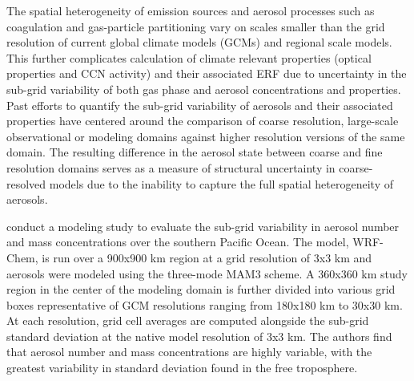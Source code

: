 The spatial heterogeneity of emission sources and aerosol processes such as coagulation and gas-particle partitioning vary on scales smaller than the grid resolution of current global climate models (GCMs) and regional scale models. This further complicates calculation of climate relevant properties  (optical properties and CCN activity) and their associated ERF due to uncertainty in the sub-grid variability of both gas phase and aerosol concentrations and properties. Past efforts to quantify the sub-grid variability of aerosols and their associated properties have centered around the comparison of coarse resolution, large-scale observational or modeling domains against higher resolution versions of the same domain. The resulting difference in the aerosol state between coarse and fine resolution domains serves as a measure of structural uncertainty in coarse-resolved models due to the inability to capture the full spatial heterogeneity of aerosols. 

\cite{lin_quantification_2017} conduct a modeling study to evaluate the sub-grid variability in aerosol number and mass concentrations over the southern Pacific Ocean. The model, WRF-Chem, is run over a 900x900 km region at a grid resolution of 3x3 km and aerosols were modeled using the three-mode MAM3 scheme. A 360x360 km study region in the center of the modeling domain is further divided into various grid boxes representative of GCM resolutions ranging from 180x180 km to 30x30 km. At each resolution, grid cell averages are computed alongside the sub-grid standard deviation at the native model resolution of 3x3 km. The authors find that aerosol number and mass concentrations are highly variable, with the greatest variability in standard deviation found in the free troposphere. 

